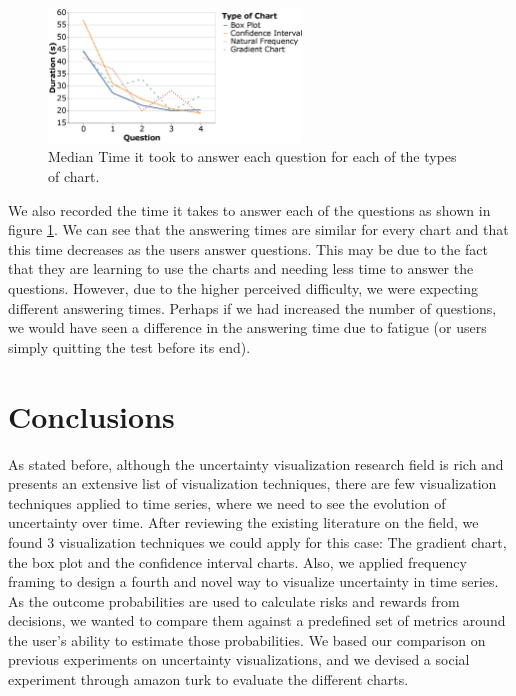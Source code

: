 \documentclass[a4paper,3p,sort&compress]{elsarticle}
\begin{document}
\begin{figure}
  \centering
   \includegraphics[width=0.6\textwidth]{duration_evo2}
  \caption{\label{figure:duration} Median Time it took to answer each question for each of the types of chart.}
\end{figure}  

We also recorded the time it takes to answer each of the questions as shown in figure \ref{figure:duration}. We 
can see that the answering times are similar for every chart and that this time decreases as the users answer questions.
This may be due to the fact that they are learning to use the charts and needing less time to answer the questions.
However, due to the higher perceived difficulty, we were expecting different answering times. Perhaps if we had 
increased the number of questions, we would have seen a difference in the answering time due to fatigue (or users simply quitting the test 
before its end).


\section{Conclusions}
\label{sec:concl}

As stated before, although the uncertainty visualization research field is rich and presents an extensive list of visualization techniques, 
there are few 
visualization techniques applied to time series, where we need to see the evolution of uncertainty 
over time. After reviewing the existing literature on the field, we found 3 visualization techniques we could apply for this case:
The gradient chart, the box plot and the confidence interval charts. Also, we applied frequency framing 
to design a fourth and novel way to visualize uncertainty in time series.
As the outcome probabilities are used to calculate risks and rewards from decisions, we wanted to compare them against a predefined set of 
metrics around the user's ability to estimate those probabilities.
We based our comparison on previous experiments on uncertainty visualizations, and we devised a social experiment through amazon turk to 
evaluate the different charts.
\end{document}
